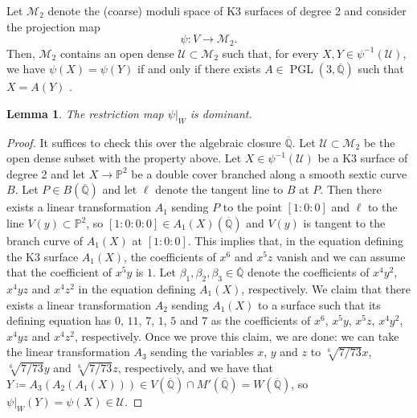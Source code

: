 \documentclass[11pt]{amsart}
\newcommand{\QQ}{\mathbb{Q}}
\newcommand{\PP}{\mathbb{P}}
\theoremstyle{plain}
\newtheorem{lemma}{Lemma}[section]
\theoremstyle{remark}
\begin{document}
Let $\mathcal{M}_2$ denote the (coarse) moduli space of K3 surfaces  of degree 2 and consider the projection map
\[
\psi : V \rightarrow \mathcal{M}_2.
\]
Then, $\mathcal{M}_2$ contains an open dense $\mathcal{U}\subset \mathcal{M}_2$ such that, for every $X, Y\in \psi^{-1}(\mathcal{U})$, we have $\psi(X)=\psi(Y)$ if and only if there exists $A\in \operatorname{PGL}(3,\overline{\QQ})$ such that $X=A(Y)$ \cite[\S 5.2]{Huyb}. 


\begin{lemma} \label{dominant}
The restriction map $\psi|_{W}$ is dominant. 
\end{lemma}
\begin{proof}
It suffices to check this over the algebraic closure $\overline{\QQ}$. Let $\mathcal{U}\subset \mathcal{M}_2$ be the open dense subset with the property above. Let $X\in \psi^{-1}(\mathcal{U})$ be a K3 surface of degree 2 and let $X\rightarrow \PP^2$ be a double cover branched along a smooth sextic curve $B$. Let $P\in B(\overline{\QQ}) $ and let $\ell$ denote the tangent line to $B$ at $P$. Then there exists a linear transformation $A_1$ sending $P$ to the point $[1:0:0]$ and $\ell$ to the line $V(y)\subset \PP^2$, so $[1:0:0:0]\in A_1(X)(\overline{\QQ})$ and $V(y)$ is tangent to the branch curve of $A_1(X)$ at $[1:0:0]$. This implies that, in the equation defining the K3 surface $A_1(X)$, the coefficients of $x^6$ and $x^5z$ vanish and we can assume that the coefficient of $x^5y$ is $1$. Let $\beta_1, \beta_2, \beta_3 \in \overline{\QQ}$ denote the coefficients of $x^4y^2$, $x^4yz$ and $x^4z^2$ in the equation defining $A_1(X)$, respectively. We claim that there exists a linear transformation $A_2$ sending $A_1(X)$ to a surface such that its defining equation has $0$, $11$, $7$, $1$, $5$ and $7$ as the coefficients of $x^6$, $x^5y$, $x^5z$, $x^4y^2$, $x^4yz$ and $x^4z^2$, respectively.
Once we prove this claim, we are done: we can take the linear transformation $A_3$ sending the variables $x$, $y$ and $z$ to $\sqrt[6]{7/73}x$, $\sqrt[6]{7/73}y$ and $\sqrt[6]{7/73}z$, respectively, and we have that $Y \coloneqq A_3(A_2(A_1(X)))\in V(\overline{\QQ})\cap M'(\overline{\QQ})=W(\overline{\QQ})$, so $\psi|_{W}(Y)=\psi(X)\in \mathcal{U}$. 


\end{proof}
\end{document}
